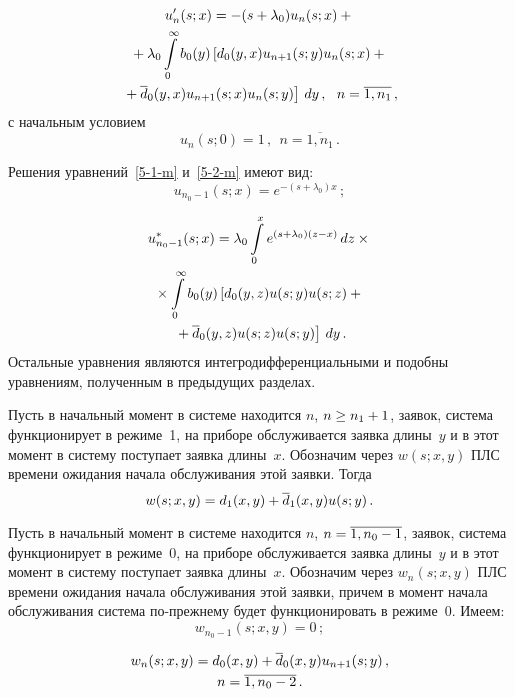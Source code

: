 \begin{multicols}{2}
\vspace*{-12pt}

\noindent
\begin{multline*}
u'_n(s;x) = - (s + \lambda_0) u_{n}(s;x) +{}\\
{}+
\lambda_0 \int\limits_0^\infty b_0(y) \left[d_0(y,x) u_{n+1}(s;y) u_{n}(s;x)
+{}\right.\\
\left.{}+\overline d_0(y,x) u_{n+1}(s;x) u_{n}(s;y)\right] \, dy\,,
\ \ n=\overline{1,n_1}\,,
\end{multline*}
с начальным условием
$$
u_n(s;0)= 1 \,,
\ \ n=\overline{1,n_1}\,.
$$

Решения уравнений~\eqref{5-1-m} и~\eqref{5-2-m} имеют вид:
$$
u_{n_0-1}(s;x)= e^{-(s + \lambda_0) x}\,;
$$

\vspace*{-12pt}

\noindent
\begin{multline}
\label{5-2-4-m}
u^*_{n_0-1}(s;x) = \lambda_0 \int\limits_0^x e^{(s + \lambda_0) (z-x)}\, dz\times{}\\
{}\times \int\limits_0^\infty b_0(y) \left[d_0(y,z) u(s;y) u(s;z)+{}\right.\\
\left.{}+
\overline d_0(y,z) u(s;z) u(s;y)\right] \, dy\,.
\end{multline}
Остальные уравнения являются интегродифференциальными
и подобны уравнениям, полученным в предыдущих разделах.

Пусть в начальный момент в системе находится
$n$, $n\hm\ge n_1\hm+1$, заявок, система функционирует
в режиме~1, на приборе обслуживается заявка
длины~$y$ и в этот момент в систему поступает
заявка длины~$x$. Обозначим через $w(s;x,y)$ ПЛС времени ожидания
начала обслуживания этой заявки.
Тогда
$$
w(s;x,y) = d_1(x,y) + \overline d_1(x,y) u(s;y) \,.
$$

Пусть в начальный момент в системе находится
$n$, $n\hm=\overline{1,n_0-1}$, заявок, система
функционирует в режиме~0, на приборе обслуживается
заявка длины~$y$ и в этот момент в систему поступает
заявка длины~$x$.
Обозначим через $w_n(s;x,y)$ ПЛС времени ожидания
начала обслуживания этой заявки, причем в момент
начала обслуживания система по-преж\-не\-му будет функционировать в режиме~0.
Имеем:
$$
w_{n_0-1}(s;x,y) = 0\,;
$$

\vspace*{-24pt}

\noindent
\begin{multline*}
w_n(s;x,y) = d_0(x,y) + \overline d_0(x,y) u_{n+1}(s;y)\, ,\\  
n=\overline{1,n_0-2}\,.
\end{multline*}


\end{multicols}
